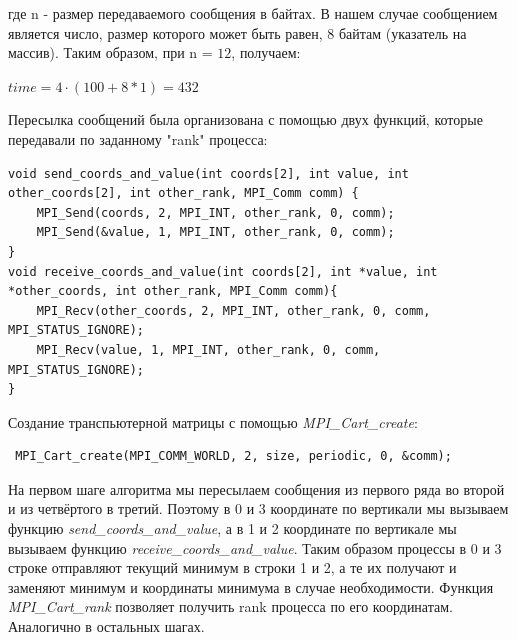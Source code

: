 \documentclass[a4paper]{article}
\begin{document}
где n - размер передаваемого сообщения в байтах. В нашем случае сообщением является
число, размер которого может быть равен, $8$ байтам (указатель на массив).
Таким образом, при n = $12$, получаем:
\begin{center}
$time = 4 · (100 + 8 * 1) = 432$
\end{center}
\newpage
Пересылка сообщений была организована с помощью двух функций, которые передавали по заданному "rank"  процесса: 
\begin{lstlisting}
void send_coords_and_value(int coords[2], int value, int other_coords[2], int other_rank, MPI_Comm comm) {
    MPI_Send(coords, 2, MPI_INT, other_rank, 0, comm);
    MPI_Send(&value, 1, MPI_INT, other_rank, 0, comm);
}
void receive_coords_and_value(int coords[2], int *value, int *other_coords, int other_rank, MPI_Comm comm){
    MPI_Recv(other_coords, 2, MPI_INT, other_rank, 0, comm, MPI_STATUS_IGNORE);
    MPI_Recv(value, 1, MPI_INT, other_rank, 0, comm, MPI_STATUS_IGNORE);
}
\end{lstlisting}

Создание транспьютерной матрицы с помощью \textit{MPI\_Cart\_create}:
\begin{lstlisting}
 MPI_Cart_create(MPI_COMM_WORLD, 2, size, periodic, 0, &comm);
\end{lstlisting}

На первом шаге алгоритма мы пересылаем сообщения из первого ряда во второй и из четвёртого в третий. Поэтому в 0 и 3 координате по вертикали мы вызываем функцию \textit{send\_coords\_and\_value}, а в 1 и 2 координате по вертикале мы вызываем функцию \textit{receive\_coords\_and\_value}. Таким образом процессы в 0 и 3 строке отправляют текущий минимум в строки 1 и 2, а те их получают и заменяют минимум и координаты минимума в случае необходимости. Функция \textit{MPI\_Cart\_rank} позволяет получить rank процесса по его координатам. Аналогично в остальных шагах.
\end{document}
